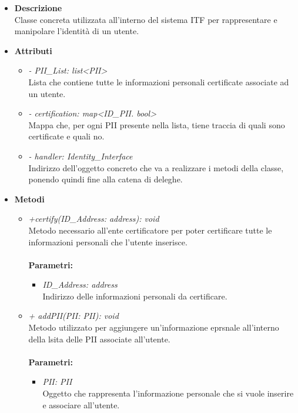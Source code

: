 \begin{itemize}
	\item \textbf{Descrizione}\\
	Classe concreta utilizzata all'interno del sistema \gls{ITF} per rappresentare e manipolare l'identità di un utente.
	\item \textbf{Attributi}
	\begin{itemize}
		\item \textit{- PII\_List: list<PII>}\\
		Lista che contiene tutte le informazioni personali certificate associate ad un utente.
		\item \textit{- certification: map<ID\_PII. bool>}\\
		Mappa che, per ogni \gls{PII} presente nella lista, tiene traccia di quali sono certificate e quali no.
		\item \textit{- handler: Identity\_Interface}\\
		Indirizzo dell'oggetto concreto che va a realizzare i metodi della classe, ponendo quindi fine alla catena di deleghe.
	\end{itemize}
	\item \textbf{Metodi}
	\begin{itemize}
		\item \textit{+certify(ID\_Address: address): void}\\
		Metodo necessario all'ente certificatore per poter certificare tutte le informazioni personali che l'utente inserisce.\\\\
		\textbf{Parametri:}
		\begin{itemize}
			\item \textit{ID\_Address: address}\\
			Indirizzo delle informazioni personali da certificare.
		\end{itemize}
		\item \textit{+ addPII(PII: PII): void}\\
		Metodo utilizzato per aggiungere un'informazione eprsnale all'interno della lsita delle \gls{PII} associate all'utente.\\\\
		\textbf{Parametri:}
		\begin{itemize}
			\item \textit{PII: PII}\\
			Oggetto che rappresenta l'informazione personale che si vuole inserire e associare all'utente.
		\end{itemize}

\end{itemize}
\end{itemize}
